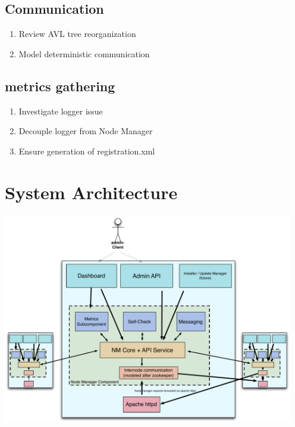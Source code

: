 \documentclass[oneside,12pt]{memoir}
\begin{document}
\subsection{Communication}

\begin{enumerate}
\item
Review AVL tree reorganization
\item
Model deterministic communication
\end{enumerate}



\subsection{metrics gathering}
\begin{enumerate}
\item Investigate logger issue
\item Decouple logger from Node Manager
\item Ensure generation of registration.xml
\end{enumerate}



\section{System Architecture}
\begin{center}
\includegraphics[width=5in]{presentation/NM-design.pdf}
\end{center}
\newpage
\end{document}
